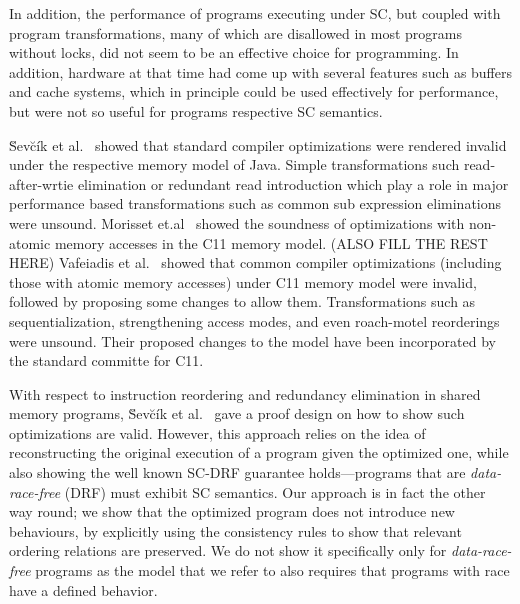     In addition, the performance of programs executing under SC, but coupled with program transformations, many of which are disallowed in most programs without locks, did not seem to be an effective choice for programming. 
    In addition, hardware at that time had come up with several features such as buffers and cache systems, which in principle could be used effectively for performance, but were not so useful for programs respective SC semantics. 

    \u{S}ev\u{c}\'{i}k et al.~\cite{SevcikJ} showed that standard compiler optimizations were rendered invalid under the respective memory model of Java. Simple transformations such read-after-wrtie elimination or redundant read introduction which play a role in major performance based transformations such as common sub expression eliminations were unsound. 
    Morisset et.al~\cite{Morisset} showed the soundness of optimizations with non-atomic memory accesses in the C11 memory model. (ALSO FILL THE REST HERE) 
    Vafeiadis et al.~\cite{VafeiadisV} showed that common compiler optimizations (including those with atomic memory accesses) under C11 memory model were invalid, followed by proposing some changes to allow them. Transformations such as sequentialization, strengthening access modes, and even roach-motel reorderings were unsound. Their proposed changes to the model have been incorporated by the standard committe for C11. 

    With respect to instruction reordering and redundancy elimination in shared memory programs, \u{S}ev\u{c}\'{i}k et al.~\cite{Sevcik2} gave a proof design on how to show such optimizations are valid. However, this approach relies on the idea of reconstructing the original execution of a program given the optimized one, while also showing the well known SC-DRF guarantee holds---programs that are \textit{data-race-free} (DRF) must exhibit SC semantics. 
    Our approach is in fact the other way round; we show that the optimized program does not introduce new behaviours, by explicitly using the consistency rules to show that relevant ordering relations are preserved. 
    We do not show it specifically only for \textit{data-race-free} programs as the model that we refer to also requires that programs with race have a defined behavior. 